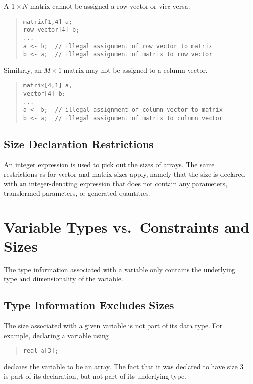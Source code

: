 A $1 \times N$ matrix cannot be assigned a row vector or
vice versa.  
%
\begin{quote}
\begin{Verbatim}
matrix[1,4] a;
row_vector[4] b;
...
a <- b;  // illegal assignment of row vector to matrix
b <- a;  // illegal assignment of matrix to row vector
\end{Verbatim}
\end{quote}
%
Similarly, an $M \times 1$ matrix may not be assigned to a column vector.
%
\begin{quote}
\begin{Verbatim}
matrix[4,1] a;
vector[4] b;
...
a <- b;  // illegal assignment of column vector to matrix
b <- a;  // illegal assignment of matrix to column vector
\end{Verbatim}
\end{quote}

\subsection{Size Declaration Restrictions}

An integer expression is used to pick out the sizes of arrays.  The
same restrictions as for vector and matrix sizes apply, namely that
the size is declared with an integer-denoting expression that does not
contain any parameters, transformed parameters, or generated quantities.

\section{Variable Types vs.\ Constraints and Sizes}

The type information associated with a variable only contains the
underlying type and dimensionality of the variable.  

\subsection{Type Information Excludes Sizes}

The size associated with a given variable is not part of its data
type.  For example, declaring a variable using
\begin{quote}
\begin{Verbatim}
real a[3];
\end{Verbatim}
\end{quote}
%
declares the variable  to be an array.  The fact that it was
declared to have size 3 is part of its declaration, but not part of
its underlying type.  

